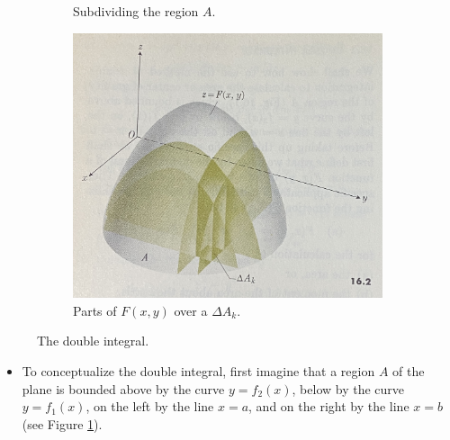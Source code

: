 \documentclass[../main.tex]{subfiles}
\begin{document}
\begin{itemize}
\begin{figure}[h!]
\begin{subfigure}[b]{0.4\linewidth}
            \caption{Subdividing the region $A$.}
            \label{fig:doubleIntegrala}
        \end{subfigure}
        \begin{subfigure}[b]{0.4\linewidth}
            \centering
            \includegraphics[width=0.9\linewidth]{ExtFiles/doubleIntegralb.jpg}
            \caption{Parts of $F(x,y)$ over a $\Delta A_k$.}
            \label{fig:doubleIntegralb}
        \end{subfigure}
        \caption{The double integral.}
        \label{fig:doubleIntegral}
    \end{figure}
    \begin{itemize}
        \item To conceptualize the double integral, first imagine that a region $A$ of the plane is bounded above by the curve $y=f_2(x)$, below by the curve $y=f_1(x)$, on the left by the line $x=a$, and on the right by the line $x=b$ (see Figure \ref{fig:doubleIntegrala}).

\end{itemize}
\end{itemize}
\end{document}
